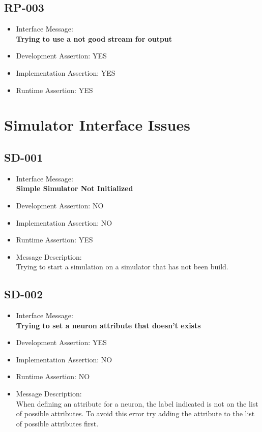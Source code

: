\subsection{RP-003}
\begin{itemize}
  \item Interface Message:\\[1em]
    \textbf{Trying to use a not good stream for output}
  \item Development Assertion: YES
  \item Implementation Assertion: YES
  \item Runtime Assertion: YES
\end{itemize}

\section{Simulator Interface Issues}

\subsection{SD-001}
\begin{itemize}
  \item Interface Message:\\[1em]
    \textbf{Simple Simulator Not Initialized}
  \item Development Assertion: NO
  \item Implementation Assertion: NO
  \item Runtime Assertion: YES
  \item Message Description:\\[1em]
    Trying to start a simulation on a simulator that has not been build.
\end{itemize}

\subsection{SD-002}
\begin{itemize}
  \item Interface Message:\\[1em]
    \textbf{Trying to set a neuron attribute that doesn't exists}
  \item Development Assertion: YES
  \item Implementation Assertion: NO
  \item Runtime Assertion: NO
  \item Message Description:\\[1em]
    When defining an attribute for a neuron, the label indicated is not on the list of possible attributes. To avoid this error try adding the attribute to the list of possible attributes first.
\end{itemize}

